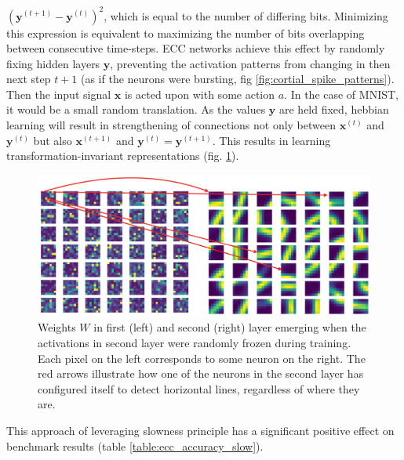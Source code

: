 \documentclass[12pt]{article}
\begin{document}
$(\boldsymbol{y}^{(t+1)}-\boldsymbol{y}^{(t)})^2$, which is equal to the number of differing bits. Minimizing this expression is equivalent to maximizing the number of bits overlapping between consecutive time-steps. ECC networks achieve this effect by randomly fixing hidden layers $\boldsymbol{y}$, preventing the activation patterns from changing in then next step $t+1$ (as if the neurons were bursting, fig \ref{fig:cortial_spike_patterns}). Then the input signal $\boldsymbol{x}$ is acted upon with some action $a$. In the case of MNIST, it would be a small random translation. 
As the values $\boldsymbol{y}$ are held fixed, hebbian learning will result in strengthening of connections not only between $\boldsymbol{x}^{(t)}$ and $\boldsymbol{y}^{(t)}$ but also $\boldsymbol{x}^{(t+1)}$ and $\boldsymbol{y}^{(t)}=\boldsymbol{y}^{(t+1)}$. This results in learning transformation-invariant representations (fig. \ref{fig:motor_drift}). 
\begin{figure}[!htbp]
	\centering
	\includegraphics[width=13.5cm]{motor_drift}
	\caption{Weights $W$ in first (left) and second (right) layer emerging when the activations in second layer were randomly frozen during training. Each pixel on the left corresponds to some neuron on the right. The red arrows illustrate how one of the neurons in the second layer has configured itself to detect horizontal lines, regardless of where they are.}
	\label{fig:motor_drift}
\end{figure} 
This approach of leveraging slowness principle has a significant  positive effect on benchmark results (table \ref{table:ecc_accuracy_slow}).
\end{document}
